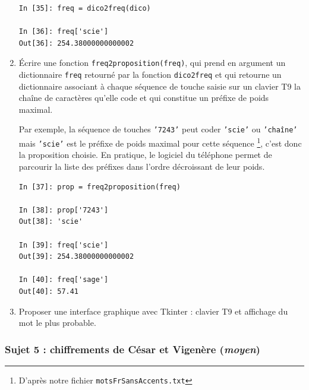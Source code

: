 \documentclass[a4paper, french, 12pt]{article}  %
\newcounter{act}
\newcounter{prop}
\begin{document}
\begin{enumerate}
\begin{lstlisting}
In [35]: freq = dico2freq(dico)

In [36]: freq['scie']
Out[36]: 254.38000000000002
\end{lstlisting}

\item Écrire une fonction \texttt{freq2proposition(freq)}, qui prend en argument un dictionnaire \texttt{freq} retourné par la fonction \texttt{dico2freq} et qui retourne un dictionnaire associant à chaque séquence de touche saisie sur un clavier T9 la chaîne de caractères qu'elle code et qui constitue un préfixe de poids maximal.

Par exemple, la séquence de touches \texttt{'7243'} peut coder \texttt{'scie'} ou \texttt{'chaîne'} mais \texttt{'scie'} est le préfixe de poids maximal pour cette séquence \footnote{D'après notre fichier \texttt{motsFrSansAccents.txt}}, c'est donc la proposition choisie. En pratique, le logiciel du téléphone permet de parcourir la liste des préfixes dans l'ordre décroissant de leur poids.
\begin{lstlisting}
In [37]: prop = freq2proposition(freq)

In [38]: prop['7243']
Out[38]: 'scie'

In [39]: freq['scie']
Out[39]: 254.38000000000002

In [40]: freq['sage']
Out[40]: 57.41 
\end{lstlisting}


\item Proposer une interface graphique avec Tkinter : clavier T9 et affichage du mot le plus probable.

\end{enumerate}



\subsubsection{Sujet 5 : chiffrements de César et Vigenère  (\textit{moyen})}
\end{document}
